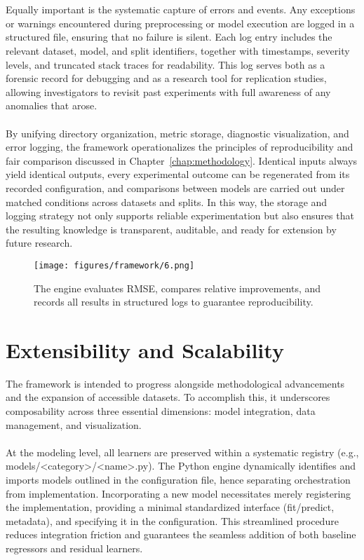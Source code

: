 \\\\Equally important is the systematic capture of errors and events. Any exceptions or warnings encountered during preprocessing or model execution are logged in a structured file, ensuring that no failure is silent. Each log entry includes the relevant dataset, model, and split identifiers, together with timestamps, severity levels, and truncated stack traces for readability. This log serves both as a forensic record for debugging and as a research tool for replication studies, allowing investigators to revisit past experiments with full awareness of any anomalies that arose.
\\\\By unifying directory organization, metric storage, diagnostic visualization, and error logging, the framework operationalizes the principles of reproducibility and fair comparison discussed in Chapter~\ref{chap:methodology}. Identical inputs always yield identical outputs, every experimental outcome can be regenerated from its recorded configuration, and comparisons between models are carried out under matched conditions across datasets and splits. In this way, the storage and logging strategy not only supports reliable experimentation but also ensures that the resulting knowledge is transparent, auditable, and ready for extension by future research.

\begin{figure}[H]
\centering
 \texttt{[image: figures/framework/6.png]}
 \caption[Performance evaluation, logging, and reproducibility pipeline.]{The engine evaluates RMSE, compares relative improvements, and records all results in structured logs to guarantee reproducibility.}
 \label{fig:performance_evaluation}
\end{figure}
\section{Extensibility and Scalability}
 The framework is intended to progress alongside methodological advancements and the expansion of accessible datasets.  To accomplish this, it underscores composability across three essential dimensions: model integration, data management, and visualization. 
\\\\ At the modeling level, all learners are preserved within a systematic registry (e.g., models/<category>/<name>.py).  The Python engine dynamically identifies and imports models outlined in the configuration file, hence separating orchestration from implementation.  Incorporating a new model necessitates merely registering the implementation, providing a minimal standardized interface (fit/predict, metadata), and specifying it in the configuration.  This streamlined procedure reduces integration friction and guarantees the seamless addition of both baseline regressors and residual learners.  


